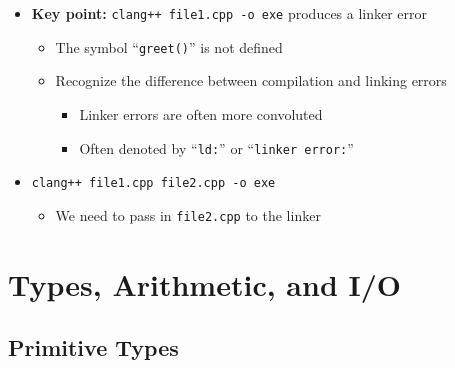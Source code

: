 \documentclass{article}
\begin{document}




\begin{itemize}
	\item \textbf{Key point:} \texttt{clang++ file1.cpp -o exe} produces a linker error \begin{itemize}
		\item The symbol ``\texttt{greet()}'' is not defined
		\item Recognize the difference between compilation and linking errors \begin{itemize}
			\item Linker errors are often more convoluted
			\item Often denoted by ``\texttt{ld:}'' or ``\texttt{linker error:}'' 
		\end{itemize}
	\end{itemize}
	\item \texttt{clang++ file1.cpp file2.cpp -o exe} \begin{itemize}
		\item We need to pass in \texttt{file2.cpp} to the linker
	\end{itemize}
\end{itemize}

\section{Types, Arithmetic, and I/O}

\subsection{Primitive Types}
\end{document}
